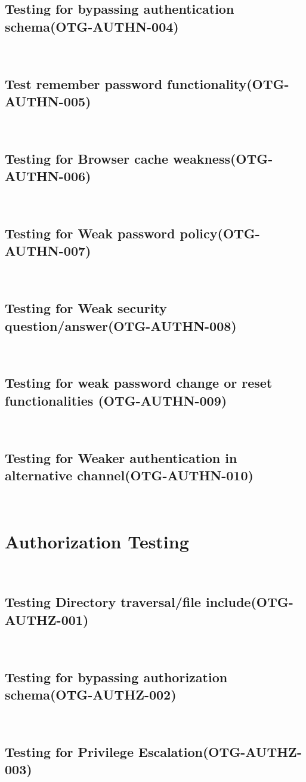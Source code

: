 \documentclass[headsepline,footsepline,footinclude=false,oneside,fontsize=11pt,paper=a4,listof=totoc,bibliography=totoc]{scrbook} %
\begin{document}
\subsection{Testing for bypassing authentication schema(OTG-AUTHN-004)}\
\pagebreak 
\subsection{Test remember password functionality(OTG-AUTHN-005)}\
\pagebreak 
\subsection{Testing for Browser cache weakness(OTG-AUTHN-006)}\
\pagebreak 
\subsection{Testing for Weak password policy(OTG-AUTHN-007)}\
\pagebreak 
\subsection{Testing for Weak security question/answer(OTG-AUTHN-008)}\
\pagebreak 
\subsection{Testing for weak password change or reset functionalities (OTG-AUTHN-009)}\
\pagebreak 
\subsection{Testing for Weaker authentication in alternative channel(OTG-AUTHN-010)}\
 
\pagebreak 
\section{Authorization Testing}\
\subsection{Testing Directory traversal/file include(OTG-AUTHZ-001)}\
\pagebreak 
\subsection{Testing for bypassing authorization schema(OTG-AUTHZ-002)}\
\pagebreak 
\subsection{Testing for Privilege Escalation(OTG-AUTHZ-003)}\
\pagebreak 
\end{document}
